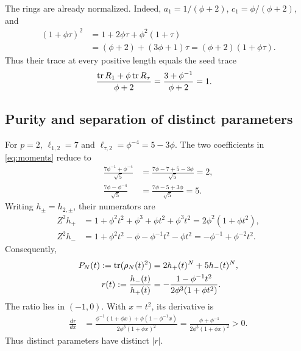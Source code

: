 \documentclass[aps,pra,reprint,nofootinbib,onecolumn]{revtex4-2}
\begin{document}
The rings are already normalized. Indeed,
$a_1=1/(\phi+2)$, $c_1=\phi/(\phi+2)$, and
\begin{align}
	(1+\phi\tau)^2
	 & =1+2\phi\tau+\phi^2(1+\tau)
	\nonumber                      \\
	 & =(\phi+2)+(3\phi+1)\tau
	=(\phi+2)(1+\phi\tau).
\end{align}
Thus their trace at every positive length equals the seed trace
\begin{align}
	\frac{\operatorname{tr} R_1+\phi\operatorname{tr} R_\tau}{\phi+2}
	 & =\frac{3+\phi^{-1}}{\phi+2}=1.
\end{align}

\subsection{Purity and separation of distinct parameters}

For $p=2$, $\ell_{1,2}=7$ and $\ell_{\tau,2}=\phi^{-4}=5-3\phi$.
The two coefficients in \cref{eq:moments} reduce to
\begin{align}
	\frac{7\phi^{-1}+\phi^{-4}}{\sqrt5}
	 & =\frac{7\phi-7+5-3\phi}{\sqrt5}=2,
	\nonumber                             \\
	\frac{7\phi-\phi^{-4}}{\sqrt5}
	 & =\frac{7\phi-5+3\phi}{\sqrt5}=5.
\end{align}
Writing $h_\pm=h_{2,\pm}$, their numerators are
\begin{align}
	Z^2h_+
	 & =1+\phi^2t^2+\phi^3+\phi t^2+\phi^3t^2
	=2\phi^2(1+\phi t^2),
	\nonumber                                  \\
	Z^2h_-
	 & =1+\phi^2t^2-\phi-\phi^{-1}t^2-\phi t^2
	=-\phi^{-1}+\phi^{-2}t^2.
\end{align}
Consequently,
\begin{align}
	P_N(t):=\operatorname{tr}(\rho_N(t)^2)
	 & =2h_+(t)^N+5h_-(t)^N,
	\nonumber                                        \\
	r(t):=\frac{h_-(t)}{h_+(t)}
	 & =-\frac{1-\phi^{-1}t^2}{2\phi^3(1+\phi t^2)}.
	\label{eq:purity}
\end{align}
The ratio lies in $(-1,0)$. With $x=t^2$, its derivative is
\begin{align}
	\frac{dr}{dx}
	 & =\frac{\phi^{-1}(1+\phi x)+\phi(1-\phi^{-1}x)}
	    {2\phi^3(1+\phi x)^2}
	=\frac{\phi+\phi^{-1}}{2\phi^3(1+\phi x)^2}>0.
	\label{eq:r-injective}
\end{align}
Thus distinct parameters have distinct $|r|$.
\end{document}
